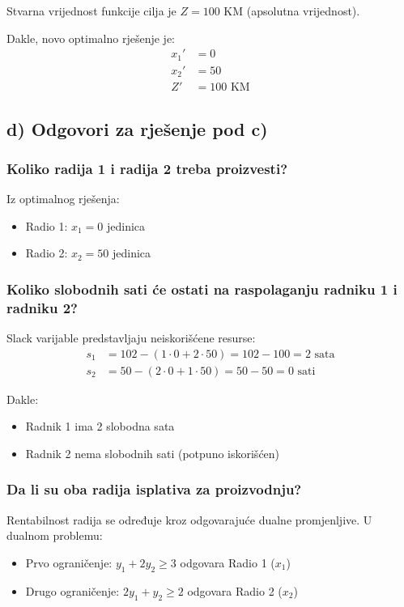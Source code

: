 \documentclass[12pt,a4paper]{article}
\begin{document}
Stvarna vrijednost funkcije cilja je $Z = 100$ KM (apsolutna vrijednost).

Dakle, novo optimalno rješenje je:
\begin{align}
x_1' &= 0 \\
x_2' &= 50 \\
Z' &= 100 \text{ KM}
\end{align}

\subsection{d) Odgovori za rješenje pod c)}

\subsubsection{Koliko radija 1 i radija 2 treba proizvesti?}

Iz optimalnog rješenja:
\begin{itemize}
\item Radio 1: $x_1 = 0$ jedinica
\item Radio 2: $x_2 = 50$ jedinica
\end{itemize}

\subsubsection{Koliko slobodnih sati će ostati na raspolaganju radniku 1 i radniku 2?}

Slack varijable predstavljaju neiskorišćene resurse:
\begin{align}
s_1 &= 102 - (1 \cdot 0 + 2 \cdot 50) = 102 - 100 = 2 \text{ sata} \\
s_2 &= 50 - (2 \cdot 0 + 1 \cdot 50) = 50 - 50 = 0 \text{ sati}
\end{align}

Dakle:
\begin{itemize}
\item Radnik 1 ima 2 slobodna sata
\item Radnik 2 nema slobodnih sati (potpuno iskorišćen)
\end{itemize}

\subsubsection{Da li su oba radija isplativa za proizvodnju?}

Rentabilnost radija se određuje kroz odgovarajuće dualne promjenljive. U dualnom problemu:
\begin{itemize}
\item Prvo ograničenje: $y_1 + 2y_2 \geq 3$ odgovara Radio 1 ($x_1$)
\item Drugo ograničenje: $2y_1 + y_2 \geq 2$ odgovara Radio 2 ($x_2$)
\end{itemize}
\end{document}
